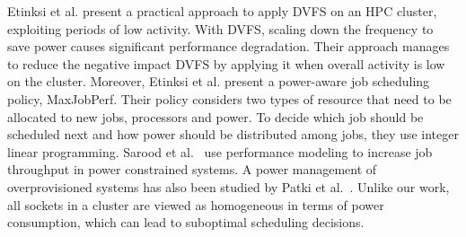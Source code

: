 Etinksi et al. \cite{Etinski2010} present a practical approach to apply DVFS on an HPC
cluster, exploiting periods of low activity.  With DVFS, scaling down the frequency to 
save power causes significant performance degradation.  Their approach manages to reduce
the negative impact DVFS by applying it when overall activity is low on the cluster. 
Moreover, Etinksi et al. \cite{Etinski2012615} present
a power-aware job scheduling policy, MaxJobPerf.  Their policy considers two types of
resource that need to be allocated to new jobs, processors and power.  To
decide which job should be scheduled next and how power should be distributed
among jobs, they use integer linear programming.
Sarood et al.~\cite{Sarood:2014:MTO:2683593.2683682} use performance modeling
to increase job throughput in power constrained systems.  A power management of
overprovisioned systems has also been studied by Patki et
al.~\cite{patki:2013:eho:2464996.2465009,7515666}. 
Unlike our work, all sockets in a cluster are viewed as homogeneous in terms of power 
consumption, which can lead to suboptimal scheduling decisions.

